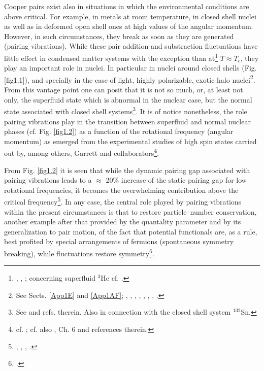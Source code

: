  Cooper pairs exist also in situations in which the environmental conditions are above critical. For example, in metals at room temperature, in closed shell nuclei as well as in deformed open shell ones at high values of the angular momentum. However, in such circumstances, they break as soon as they are generated (pairing vibrations). While these pair addition and substraction fluctuations have little effect in condensed matter systems with the exception than at\footnote{\cite{Schmid:66}, \cite{Schmidt:68}, \cite{Schmid:69} \cite{Abrahams:68}; concerning superfluid $^3$He cf. \cite{Wolfe:78}.} $T\approx T_c$, they play an important role in nuclei. In particular in nuclei around closed shells (Fig. \ref{fig1.1}), and specially in the case of light, highly polarizable, exotic halo nuclei\footnote{See Sects. \ref{App1E} and \ref{App1AF}; \cite{Bohr:75} , \cite{Bes:66}, \cite{Hogassen:61}, \cite{Schmidt:72}, \cite{Schmidt:68}, \cite{Barranco:01}, \cite{Potel:13}, \cite{Potel:14}.}. From this vantage point one can posit that it is not so much, or, at least not only, the superfluid state which is abnormal in the nuclear case, but the normal state associated with closed shell systems\footnote{See \cite{Potel:13} and refs. therein. Also \cite{Potel:13b} in connection with the closed shell system $^{132}$Sn.}. It is of notice nonetheless, the role pairing vibrations play in the  transition between superfluid and normal nuclear phases (cf. Fig. \ref{fig1.2}) as a function of the rotational frequency (angular momentum) as emerged from the experimental studies of high spin states carried out by, among others, Garrett and collaborators\footnote{cf. \cite{Shimizu:89}; cf. also \cite{Brink:05}, Ch. 6 and references therein.}.
 
 
  From Fig. \ref{fig1.2} it is seen that while the dynamic pairing gap associated with pairing vibrations leads to a $\approx$ 20\% increase of the static pairing gap for low rotational frequencies, it becomes the overwhelming contribution above the critical frequency\footnote{\cite{Shimizu:89}, \cite{Shimizu:90}, \cite{Shimizu:13},  \cite{Donau:99} \cite{Shimizu:00}.}. In any case, the central role played by pairing vibrations within the present circumstances is that to restore particle--number conservation, another example after that provided by the quantality parameter and by its generalization to pair motion, of the fact that potential functionals are, as a rule, best profited by special arrangements of fermions (spontaneous symmetry breaking), while fluctuations restore symmetry\footnote{\cite{Anderson:84,Anderson:97}.}. 
  
